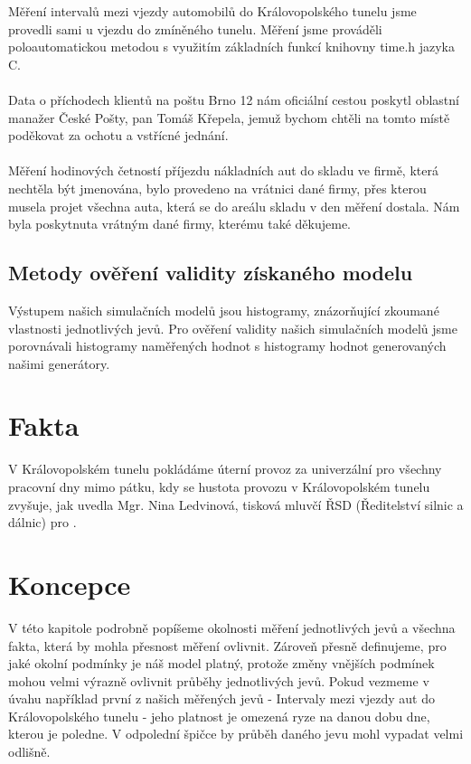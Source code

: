 \documentclass[11pt,a4paper]{article}
\begin{document}
	Měření intervalů mezi vjezdy automobilů
	do Královopolského tunelu jsme provedli sami u vjezdu do zmíněného tunelu. Měření jsme prováděli
	poloautomatickou metodou s využitím základních funkcí knihovny time.h jazyka C. \\ \\

	Data o příchodech klientů na poštu Brno 12 nám oficiální cestou poskytl oblastní manažer 
	České Pošty, pan Tomáš Křepela, jemuž bychom chtěli na tomto místě poděkovat za ochotu a 
	vstřícné jednání. \\ \\

	Měření hodinových četností příjezdu nákladních aut do skladu ve firmě, která nechtěla být 
	jmenována, bylo provedeno na vrátnici dané firmy, přes kterou musela projet všechna auta, která 
	se do areálu skladu v den měření dostala. Nám byla poskytnuta vrátným dané firmy, kterému také 
	děkujeme.

	\subsection{Metody ověření validity získaného modelu}
	Výstupem našich simulačních modelů jsou histogramy, znázorňující zkoumané vlastnosti
	jednotlivých jevů. Pro ověření validity našich simulačních modelů jsme porovnávali 
	histogramy naměřených hodnot s histogramy hodnot generovaných našimi generátory.


\section{Fakta}
V Královopolském tunelu pokládáme úterní provoz za univerzální pro všechny pracovní dny mimo pátku, kdy 
se hustota provozu v Královopolském tunelu zvyšuje, jak uvedla Mgr. Nina Ledvinová, tisková mluvčí ŘSD 
(Ředitelství silnic a dálnic) pro \cite{doipo}.

\section{Koncepce}
V této kapitole podrobně popíšeme okolnosti měření jednotlivých jevů a všechna fakta, která by mohla
přesnost měření ovlivnit. Zároveň přesně definujeme, pro jaké okolní podmínky je náš model 
platný, protože změny vnějších podmínek mohou velmi výrazně ovlivnit průběhy jednotlivých jevů.
Pokud vezmeme v úvahu například první z našich měřených jevů - Intervaly mezi vjezdy aut do Královopolského
tunelu - jeho platnost je omezená ryze na danou dobu dne, kterou je poledne. V odpolední špičce
by průběh daného jevu mohl vypadat velmi odlišně.
\end{document}
